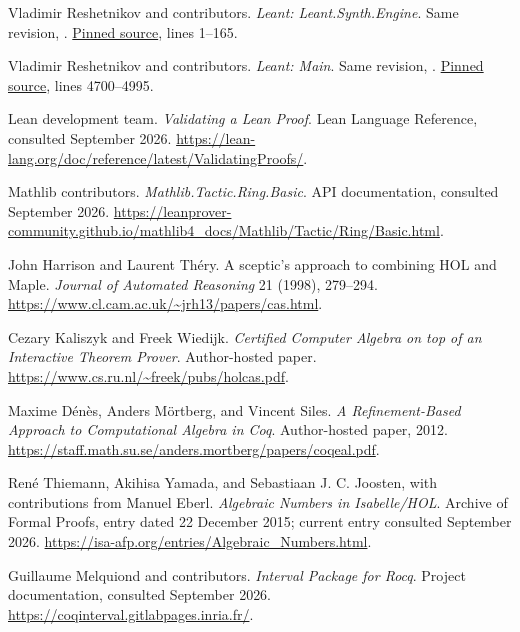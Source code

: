 \documentclass[11pt,letterpaper]{article}
\newcommand{\src}[2]{\href{#1}{#2}}
\numberwithin{equation}{section}
\begin{document}
\begin{thebibliography}{99}
 Vladimir Reshetnikov and contributors.
\emph{Leant: Leant.Synth.Engine}. Same revision,
.
\src{https://github.com/VladimirReshetnikov/Leant/blob/3a40904be8a410d832d9ab6900b3d3e7b425eccb/src/Leant/Synth/Engine.hs}{Pinned source}, lines 1--165.

 Vladimir Reshetnikov and contributors.
\emph{Leant: Main}. Same revision, .
\src{https://github.com/VladimirReshetnikov/Leant/blob/3a40904be8a410d832d9ab6900b3d3e7b425eccb/src/Main.hs}{Pinned source}, lines 4700--4995.

 Lean development team.
\emph{Validating a Lean Proof}. Lean Language Reference, consulted September 2026.
\url{https://lean-lang.org/doc/reference/latest/ValidatingProofs/}.

 Mathlib contributors.
\emph{Mathlib.Tactic.Ring.Basic}. API documentation, consulted September 2026.
\url{https://leanprover-community.github.io/mathlib4_docs/Mathlib/Tactic/Ring/Basic.html}.

 John Harrison and Laurent Th\'ery.
A sceptic's approach to combining HOL and Maple.
\emph{Journal of Automated Reasoning} 21 (1998), 279--294.
\url{https://www.cl.cam.ac.uk/~jrh13/papers/cas.html}.

 Cezary Kaliszyk and Freek Wiedijk.
\emph{Certified Computer Algebra on top of an Interactive Theorem Prover}.
Author-hosted paper.
\url{https://www.cs.ru.nl/~freek/pubs/holcas.pdf}.

 Maxime D\'en\`es, Anders M\"ortberg, and Vincent Siles.
\emph{A Refinement-Based Approach to Computational Algebra in Coq}.
Author-hosted paper, 2012.
\url{https://staff.math.su.se/anders.mortberg/papers/coqeal.pdf}.

 Ren\'e Thiemann, Akihisa Yamada, and Sebastiaan J. C. Joosten,
with contributions from Manuel Eberl.
\emph{Algebraic Numbers in Isabelle/HOL}. Archive of Formal Proofs,
entry dated 22 December 2015; current entry consulted September 2026.
\url{https://isa-afp.org/entries/Algebraic_Numbers.html}.

 Guillaume Melquiond and contributors.
\emph{Interval Package for Rocq}. Project documentation, consulted September 2026.
\url{https://coqinterval.gitlabpages.inria.fr/}.

\end{thebibliography}
\end{document}
